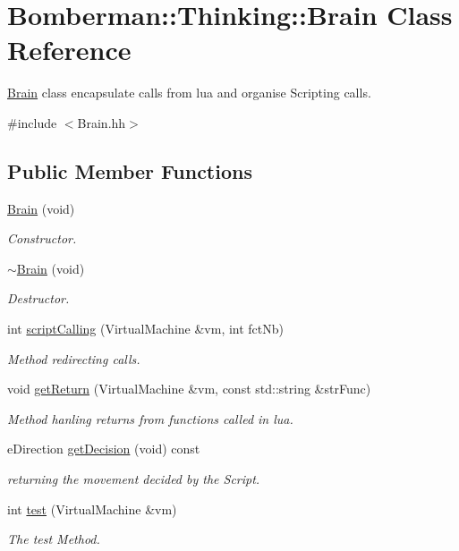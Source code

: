 \hypertarget{classBomberman_1_1Thinking_1_1Brain}{
\section{Bomberman::Thinking::Brain Class Reference}
\label{classBomberman_1_1Thinking_1_1Brain}
}


\hyperlink{classBomberman_1_1Thinking_1_1Brain}{Brain} class encapsulate calls from lua and organise Scripting calls.  




{\ttfamily \#include $<$Brain.hh$>$}

\subsection*{Public Member Functions}
\begin{DoxyCompactItemize}
\item 
\hyperlink{classBomberman_1_1Thinking_1_1Brain_a7f1f608a4157bf556c71e09e00352572}{Brain} (void)
\begin{DoxyCompactList}\small\item\em Constructor. \end{DoxyCompactList}\item 
\hyperlink{classBomberman_1_1Thinking_1_1Brain_a8a8eee0a0dd9d1e771d1e452496dead9}{$\sim$Brain} (void)
\begin{DoxyCompactList}\small\item\em Destructor. \end{DoxyCompactList}\item 
int \hyperlink{classBomberman_1_1Thinking_1_1Brain_a328b9de11566dedba18161aa82ca232b}{scriptCalling} (VirtualMachine \&vm, int fctNb)
\begin{DoxyCompactList}\small\item\em Method redirecting calls. \end{DoxyCompactList}\item 
void \hyperlink{classBomberman_1_1Thinking_1_1Brain_ab271bda1c21a134ab8aa375755439ba9}{getReturn} (VirtualMachine \&vm, const std::string \&strFunc)
\begin{DoxyCompactList}\small\item\em Method hanling returns from functions called in lua. \end{DoxyCompactList}\item 
eDirection \hyperlink{classBomberman_1_1Thinking_1_1Brain_a71113227c22ea6973bf0210384939696}{getDecision} (void) const 
\begin{DoxyCompactList}\small\item\em returning the movement decided by the Script. \end{DoxyCompactList}\item 
int \hyperlink{classBomberman_1_1Thinking_1_1Brain_a8f68d82b0a73f1ff626e54f238d51cee}{test} (VirtualMachine \&vm)
\begin{DoxyCompactList}\small\item\em The test Method. \end{DoxyCompactList}\end{DoxyCompactItemize}


